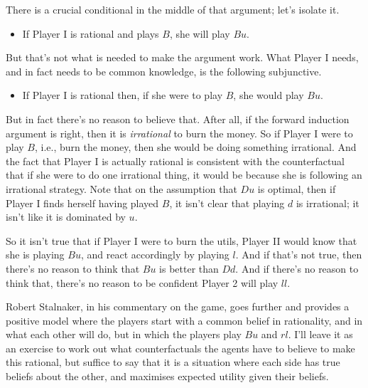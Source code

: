 \documentclass[openany]{book}
\begin{document}
There is a crucial conditional in the middle of that argument; let's isolate it.

\begin{itemize}
\item If Player I is rational and plays $B$, she will play $Bu$.
\end{itemize}
But that's not what is needed to make the argument work. What Player I needs, and in fact needs to be common knowledge, is the following subjunctive.

\begin{itemize}
\item If Player I is rational then, if she were to play $B$, she would play $Bu$.
\end{itemize}
But in fact there's no reason to believe that. After all, if the forward induction argument is right, then it is \textit{irrational} to burn the money. So if Player I were to play $B$, i.e., burn the money, then she would be doing something irrational. And the fact that Player I is actually rational is consistent with the counterfactual that if she were to do one irrational thing, it would be because she is following an irrational strategy. Note that on the assumption that $Du$ is optimal, then if Player I finds herself having played $B$, it isn't clear that playing $d$ is irrational; it isn't like it is dominated by $u$.

So it isn't true that if Player I were to burn the utils, Player II would know that she is playing $Bu$, and react accordingly by playing $l$. And if that's not true, then there's no reason to think that $Bu$ is better than $Dd$. And if there's no reason to think that, there's no reason to be confident Player 2 will play $ll$.

Robert Stalnaker, in his commentary on the game, goes further and provides a positive model where the players start with a common belief in rationality, and in what each other will do, but in which the players play $Bu$ and $rl$. I'll leave it as an exercise to work out what counterfactuals the agents have to believe to make this rational, but suffice to say that it is a situation where each side has true beliefs about the other, and maximises expected utility given their beliefs.
\end{document}
